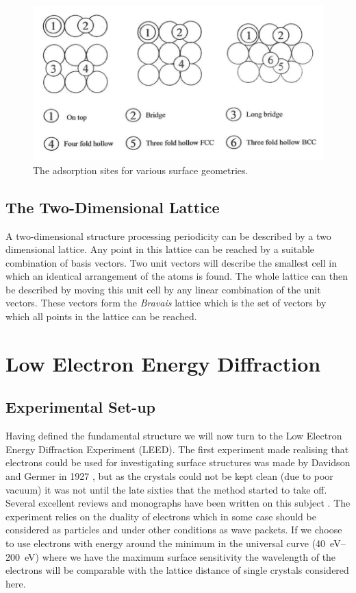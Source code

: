 \begin{figure}[h!]
	\begin{center}
	\includegraphics[scale=3.5]{figures/09_04.png}
	\caption{The adsorption sites for various surface geometries.}
	\label{fig:adsorptionsites}
	\end{center}
\end{figure}

\subsection{The Two-Dimensional Lattice}
A two-dimensional structure processing periodicity can be described by a two dimensional lattice. Any point in this lattice can be reached by a suitable combination of basis vectors. Two unit vectors will describe the smallest cell in which an identical arrangement of the atoms is found. The whole lattice can then be described by moving this unit cell by any linear combination of the unit vectors. These vectors form the {\it Bravais} lattice which is the set of vectors by which all points in the lattice can be reached.

\section{Low Electron Energy Diffraction}
\subsection{Experimental Set-up}
Having defined the fundamental structure we will now turn to the Low Electron Energy Diffraction Experiment (LEED). The first experiment made realising that electrons could be used for investigating surface structures was made by Davidson and Germer in 1927 \cite{Davidson}, but as the crystals could not be kept clean (due to poor vacuum) it was not until the late sixties that the method started to take off. Several excellent reviews and monographs have been written on this subject \cite{Pendry, Hove, Heinz, Ertl}. The experiment relies on the duality of electrons which in some case should be considered as particles and under other conditions as wave packets. If we choose to use electrons with energy around the minimum in the universal curve (\SIrange{40}{200}{\electronvolt}) where we have the maximum surface sensitivity the wavelength of the electrons will be comparable with the lattice distance of single crystals considered here.

